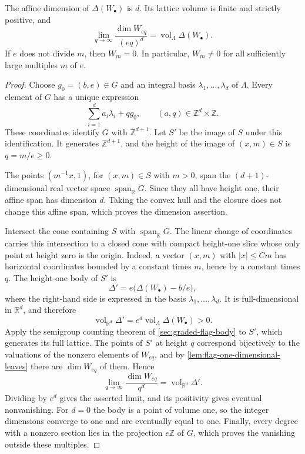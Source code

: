 \begin{theorem}\label{thm:intrinsic-flag-count}
The affine dimension of $\Delta(W_\bullet)$ is $d$. Its lattice volume is finite and strictly positive, and
\[
 \lim_{q\to\infty}\frac{\dim W_{eq}}{(eq)^d}
 =\operatorname{vol}_\Lambda\Delta(W_\bullet).
\]
If $e$ does not divide $m$, then $W_m=0$. In particular, $W_m\neq0$ for all sufficiently large multiples $m$ of $e$.
\end{theorem}
\begin{proof}
Choose $g_0=(b,e)\in G$ and an integral basis $\lambda_1,\ldots,\lambda_d$ of $\Lambda$. Every element of $G$ has a unique expression
\[
 \sum_{i=1}^d a_i\lambda_i+qg_0,
 \qquad (a,q)\in\mathbb Z^d\times\mathbb Z.
\]
These coordinates identify $G$ with $\mathbb Z^{d+1}$. Let $S'$ be the image of $S$ under this identification. It generates $\mathbb Z^{d+1}$, and the height of the image of $(x,m)\in S$ is $q=m/e\geq0$.

The points $(m^{-1}x,1)$, for $(x,m)\in S$ with $m>0$, span the $(d+1)$-dimensional real vector space $\operatorname{span}_{\mathbb R}G$. Since they all have height one, their affine span has dimension $d$. Taking the convex hull and the closure does not change this affine span, which proves the dimension assertion.

Intersect the cone containing $S$ with $\operatorname{span}_{\mathbb R}G$. The linear change of coordinates carries this intersection to a closed cone with compact height-one slice whose only point at height zero is the origin. Indeed, a vector $(x,m)$ with $|x|\leq Cm$ has horizontal coordinates bounded by a constant times $m$, hence by a constant times $q$. The height-one body of $S'$ is
\[
 \Delta'=e\bigl(\Delta(W_\bullet)-b/e\bigr),
\]
where the right-hand side is expressed in the basis $\lambda_1,\ldots,\lambda_d$. It is full-dimensional in $\mathbb R^d$, and therefore
\[
 \operatorname{vol}_{\mathbb R^d}\Delta'
 =e^d\operatorname{vol}_\Lambda\Delta(W_\bullet)>0.
\]
Apply the semigroup counting theorem of \cref{sec:graded-flag-body} to $S'$, which generates its full lattice. The points of $S'$ at height $q$ correspond bijectively to the valuations of the nonzero elements of $W_{eq}$, and by \cref{lem:flag-one-dimensional-leaves} there are $\dim W_{eq}$ of them. Hence
\[
 \lim_{q\to\infty}\frac{\dim W_{eq}}{q^d}
 =\operatorname{vol}_{\mathbb R^d}\Delta'.
\]
Dividing by $e^d$ gives the asserted limit, and its positivity gives eventual nonvanishing. For $d=0$ the body is a point of volume one, so the integer dimensions converge to one and are eventually equal to one. Finally, every degree with a nonzero section lies in the projection $e\mathbb Z$ of $G$, which proves the vanishing outside these multiples.
\end{proof}

